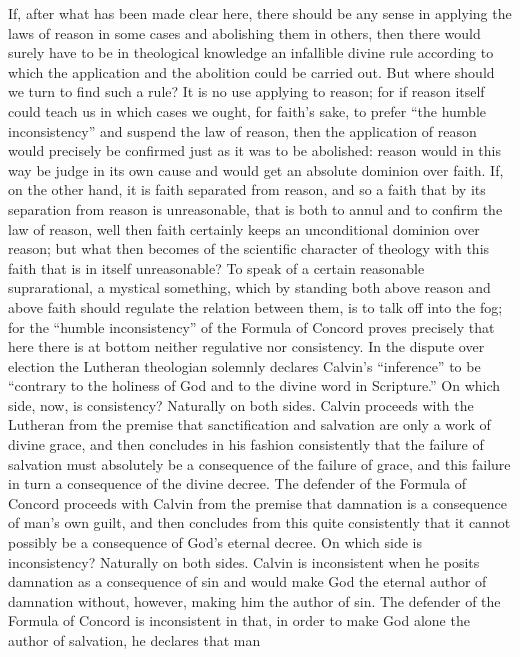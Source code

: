\documentclass[12pt]{book}
\newcommand{\opage}[1]{\marginnote{\footnotesize\textit{[#1]}}}
\begin{document}
If, after what has been made clear here, there should be any sense in applying
the laws of reason in some cases and abolishing them in others, then there
would surely have to be in theological knowledge an infallible divine rule
according to which the application and the abolition could be carried out.
But where should we turn to find such a rule? It is no use applying to reason;
for if reason itself could teach us in which cases we ought, for faith's
sake, to prefer ``the humble inconsistency'' and suspend the law of reason,
then the application of reason would precisely be confirmed just as it was to
be abolished: reason would in this way be judge in its own cause and would get
an absolute dominion over faith. If, on the other hand, it is faith separated
from reason, and so a faith that by its separation from reason is unreasonable,
that is both to annul and to confirm the law of reason, well then faith
certainly keeps an unconditional dominion over reason; but what then becomes
of the scientific character of theology with this faith that is in itself
unreasonable? To speak of a certain reasonable suprarational, a mystical
something, which by standing both above reason and above faith should regulate
the relation between them, is to talk off into the fog; for the ``humble
inconsistency'' of the Formula of Concord proves precisely that here there is
at bottom neither regulative nor consistency. In the dispute over election the
Lutheran theologian solemnly declares Calvin's ``inference'' to be ``contrary
to the holiness of God and to the divine word in Scripture.'' On which side,
now, is consistency? Naturally on both sides. Calvin proceeds with the
Lutheran from the premise that sanctification and salvation are only a work
of divine grace, and then concludes in his fashion
\opage{248}\setcounter{footnote}{0}%
consistently that the failure of salvation must absolutely be a consequence
of the failure of grace, and this failure in turn a consequence of the divine
decree. The defender of the Formula of Concord proceeds with Calvin from the
premise that damnation is a consequence of man's own guilt, and then concludes
from this quite consistently that it cannot possibly be a consequence of God's
eternal decree. On which side is inconsistency? Naturally on both sides.
Calvin is inconsistent when he posits damnation as a consequence of sin and
would make God the eternal author of damnation without, however, making him
the author of sin. The defender of the Formula of Concord is inconsistent in
that, in order to make God alone the author of salvation, he declares that man
\end{document}
